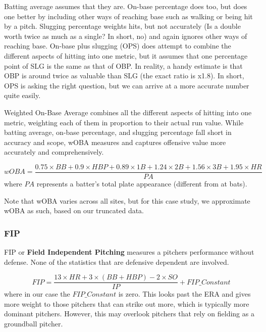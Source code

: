 \documentclass[12pt]{article}
\numberwithin{equation}{subsection}
\begin{document}
\begin{displayquote}
Batting average assumes that they are. On-base percentage does too, but does one better by including other ways of reaching base such as walking or being hit by a pitch. Slugging percentage weights hits, but not accurately (Is a double worth twice as much as a single? In short, no) and again ignores other ways of reaching base. On-base plus slugging (OPS) does attempt to combine the different aspects of hitting into one metric, but it assumes that one percentage point of SLG is the same as that of OBP. In reality, a handy estimate is that OBP is around twice as valuable than SLG (the exact ratio is x1.8). In short, OPS is asking the right question, but we can arrive at a more accurate number quite easily.

Weighted On-Base Average combines all the different aspects of hitting into one metric, weighting each of them in proportion to their actual run value. While batting average, on-base percentage, and slugging percentage fall short in accuracy and scope, wOBA measures and captures offensive value more accurately and comprehensively. 

\end{displayquote}

\begin{equation}
	wOBA = \frac{0.75\times BB + 0.9\times HBP + 0.89\times 1B + 1.24 \times 2B + 1.56 \times 3B + 1.95 \times HR}{PA}
\end{equation}
where $PA$ represents a batter's total plate appearance (different from at bats).

Note that wOBA varies across all sites, but for this case study, we approximate wOBA as such, based on our truncated data.

\subsubsection{FIP}
FIP or \textbf{Field Independent Pitching} measures a pitchers performance without defense. None of the statistics that are defensive dependent are involved.

\begin{equation}
	FIP = \frac{13\times HR + 3\times (BB + HBP) - 2 \times SO}{IP} + FIP\_Constant
\end{equation}
where in our case the $FIP\_Constant$ is zero. This looks past the ERA and gives more weight to those pitchers that can strike out more, which is typically more dominant pitchers. However, this may overlook pitchers that rely on fielding as a groundball pitcher.
\end{document}
